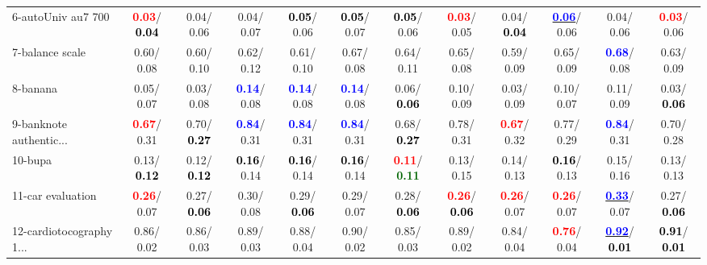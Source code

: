 \begin{table}[h]
\begin{center}
{\begin{tabular}{lc|c|c|c|c|c|c|c|c|c|c}
6-autoUniv au7 700 & \textcolor{red}{\textbf{  0.03}}/\textcolor{black}{\textbf{  0.04}} &   0.04/  0.06 &   0.04/  0.07 & \textcolor{black}{\textbf{  0.05}}/  0.06 & \textcolor{black}{\textbf{  0.05}}/  0.07 & \textcolor{black}{\textbf{  0.05}}/  0.06 & \textcolor{red}{\textbf{  0.03}}/  0.05 &   0.04/\textcolor{black}{\textbf{  0.04}} & \underline{\textcolor{blue}{\textbf{  0.06}}}/  0.06 &   0.04/  0.06 & \textcolor{red}{\textbf{  0.03}}/  0.06 \\
7-balance scale &   0.60/  0.08 &   0.60/  0.10 &   0.62/  0.12 &   0.61/  0.10 &   0.67/  0.08 &   0.64/  0.11 &   0.65/  0.08 &   0.59/  0.09 &   0.65/  0.09 & \textcolor{blue}{\textbf{  0.68}}/  0.08 &   0.63/  0.09 \\ \hline
8-banana &   0.05/  0.07 &   0.03/  0.08 & \textcolor{blue}{\textbf{  0.14}}/  0.08 & \textcolor{blue}{\textbf{  0.14}}/  0.08 & \textcolor{blue}{\textbf{  0.14}}/  0.08 &   0.06/\textcolor{black}{\textbf{  0.06}} &   0.10/  0.09 &   0.03/  0.09 &   0.10/  0.07 &   0.11/  0.09 &   0.03/\textcolor{black}{\textbf{  0.06}} \\
9-banknote authentic... & \textcolor{red}{\textbf{  0.67}}/  0.31 &   0.70/\textcolor{black}{\textbf{  0.27}} & \textcolor{blue}{\textbf{  0.84}}/  0.31 & \textcolor{blue}{\textbf{  0.84}}/  0.31 & \textcolor{blue}{\textbf{  0.84}}/  0.31 &   0.68/\textcolor{black}{\textbf{  0.27}} &   0.78/  0.31 & \textcolor{red}{\textbf{  0.67}}/  0.32 &   0.77/  0.29 & \textcolor{blue}{\textbf{  0.84}}/  0.31 &   0.70/  0.28 \\
10-bupa &   0.13/\textcolor{black}{\textbf{  0.12}} &   0.12/\textcolor{black}{\textbf{  0.12}} & \textcolor{black}{\textbf{  0.16}}/  0.14 & \textcolor{black}{\textbf{  0.16}}/  0.14 & \textcolor{black}{\textbf{  0.16}}/  0.14 & \textcolor{red}{\textbf{  0.11}}/\textcolor{darkgreen}{\textbf{  0.11}} &   0.13/  0.15 &   0.14/  0.13 & \textcolor{black}{\textbf{  0.16}}/  0.13 &   0.15/  0.16 &   0.13/  0.13 \\
11-car evaluation & \textcolor{red}{\textbf{  0.26}}/  0.07 &   0.27/\textcolor{black}{\textbf{  0.06}} &   0.30/  0.08 &   0.29/\textcolor{black}{\textbf{  0.06}} &   0.29/  0.07 &   0.28/\textcolor{black}{\textbf{  0.06}} & \textcolor{red}{\textbf{  0.26}}/\textcolor{black}{\textbf{  0.06}} & \textcolor{red}{\textbf{  0.26}}/  0.07 & \textcolor{red}{\textbf{  0.26}}/  0.07 & \underline{\textcolor{blue}{\textbf{  0.33}}}/  0.07 &   0.27/\textcolor{black}{\textbf{  0.06}} \\
12-cardiotocography 1... &   0.86/  0.02 &   0.86/  0.03 &   0.89/  0.03 &   0.88/  0.04 &   0.90/  0.02 &   0.85/  0.03 &   0.89/  0.02 &   0.84/  0.04 & \textcolor{red}{\textbf{  0.76}}/  0.04 & \underline{\textcolor{blue}{\textbf{  0.92}}}/\textcolor{black}{\textbf{  0.01}} & \textcolor{black}{\textbf{  0.91}}/\textcolor{black}{\textbf{  0.01}} \\

\end{tabular}}
\end{center}
\end{table}
